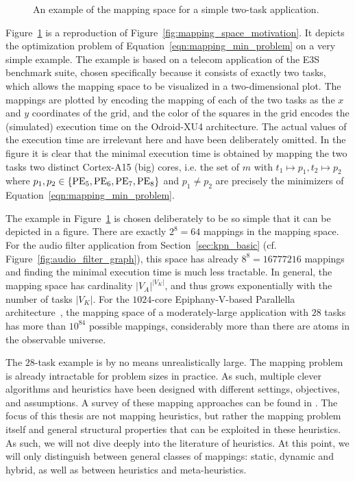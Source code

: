 \begin{figure}[h]
	\centering
\resizebox{0.95\textwidth}{!}{
   \begin{tikzpicture}
     
   \end{tikzpicture}
 }
   \caption{An example of the mapping space for a simple two-task application.}
   \label{fig:mapping_space_example}
\end{figure}

Figure~\ref{fig:mapping_space_example} is a reproduction of Figure~\ref{fig:mapping_space_motivation}. It depicts the optimization problem of Equation~\ref{eqn:mapping_min_problem} on a very simple example.
The example is based on a telecom application of the E3S benchmark suite, chosen specifically because it consists of exactly two tasks, which allows the mapping space to be visualized in a two-dimensional plot.
The mappings are plotted by encoding the mapping of each of the two tasks as the $x$ and $y$ coordinates of the grid, and the color of the squares in the grid encodes the (simulated) execution time on the Odroid-XU4 architecture.
The actual values of the execution time are irrelevant here and have been deliberately omitted. In the figure it is clear that the minimal execution time is obtained by mapping the two tasks two distinct Cortex-A15 (big) cores,
i.e. the set of $m$ with $t_1 \mapsto p_1, t_2 \mapsto p_2$ where $p_1,p_2 \in \{\operatorname{PE}_5,\operatorname{PE}_6,\operatorname{PE}_7,\operatorname{PE}_8\}$ and $p_1 \neq p_2$ are precisely the minimizers of Equation~\ref{eqn:mapping_min_problem}.

The example in Figure~\ref{fig:mapping_space_example} is chosen deliberately to be so simple that it can be depicted in a figure.
There are exactly $2^8 = 64$ mappings in the mapping space.
For the audio filter application from Section~\ref{sec:kpn_basic} (cf. Figure~\ref{fig:audio_filter_graph}), this space has already $8^8 = 16777216$ mappings and finding the minimal execution time is much less tractable.
In general, the mapping space has cardinality $|V_A|^{|V_K|}$, and thus grows exponentially with the number of tasks $|V_K|$.
For the $1024$-core Epiphany-V-based Parallella architecture~\cite{parallella}, the mapping space of a moderately-large application with $28$ tasks has more than $10^{84}$ possible mappings, considerably more than there are atoms in the observable universe.

The $28$-task example is by no means unrealistically large. The mapping problem is already intractable for problem sizes in practice. As such, multiple clever algorithms and heuristics have been designed with different settings, objectives, and assumptions.
A survey of these mapping approaches can be found in \cite{singh2013mapping}.
The focus of this thesis are not mapping heuristics, but rather the mapping problem itself and general structural properties that can be exploited in these heuristics.
As such, we will not dive deeply into the literature of heuristics. At this point, we will only distinguish between general classes of mappings: static, dynamic and hybrid, as well as between heuristics and meta-heuristics. 

